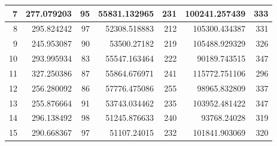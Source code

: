 \begin{table}
\begin{adjustwidth}{}{}
{{\begin{tabular}{|r|r|r|r|r|r|r|}
\hline
7                                          & 277.079203                   & 95                                    & 55831.132965                   & 231                                   & 100241.257439                & 333                                    \\ 
\hline
8                                          & 295.824242                   & 97                                    & 52308.518883                   & 212                                   & 105300.434387                & 331                                    \\ 
\hline
9                                          & 245.953087                   & 90                                    & 53500.27182                    & 219                                   & 105488.929329                & 326                                    \\ 
\hline
10                                         & 293.995934                   & 83                                    & 55547.163464                   & 222                                   & 90189.743515                 & 347                                    \\ 
\hline
11                                         & 327.250386                   & 87                                    & 55864.676971                   & 241                                   & 115772.751106                & 296                                    \\ 
\hline
12                                         & 256.280092                   & 86                                    & 57776.475086                   & 255                                   & 98965.832809                 & 337                                    \\ 
\hline
13                                         & 255.876664                   & 91                                    & 53743.034462                   & 235                                   & 103952.481422                & 347                                    \\ 
\hline
14                                         & 296.138492                   & 98                                    & 51245.876633                   & 240                                   & 93768.24028                  & 319                                    \\ 
\hline
15                                         & 290.668367                   & 97                                    & 51107.24015                    & 232                                   & 101841.903069                & 320                                    \\ 

\end{tabular}}}
\end{adjustwidth}
\end{table}
